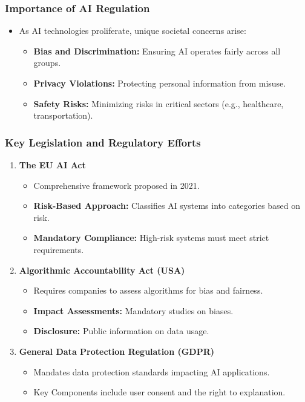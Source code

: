 \documentclass[aspectratio=169]{beamer}
\begin{document}
\begin{frame}[fragile]
    \frametitle{Importance of AI Regulation}
    \begin{itemize}
        \item As AI technologies proliferate, unique societal concerns arise:
        \begin{itemize}
            \item \textbf{Bias and Discrimination:} Ensuring AI operates fairly across all groups.
            \item \textbf{Privacy Violations:} Protecting personal information from misuse.
            \item \textbf{Safety Risks:} Minimizing risks in critical sectors (e.g., healthcare, transportation).
        \end{itemize}
    \end{itemize}
\end{frame}

\begin{frame}[fragile]
    \frametitle{Key Legislation and Regulatory Efforts}
    \begin{enumerate}
        \item \textbf{The EU AI Act}
        \begin{itemize}
            \item Comprehensive framework proposed in 2021.
            \item \textbf{Risk-Based Approach:} Classifies AI systems into categories based on risk.
            \item \textbf{Mandatory Compliance:} High-risk systems must meet strict requirements.
        \end{itemize}
        
        \item \textbf{Algorithmic Accountability Act (USA)}
        \begin{itemize}
            \item Requires companies to assess algorithms for bias and fairness.
            \item \textbf{Impact Assessments:} Mandatory studies on biases.
            \item \textbf{Disclosure:} Public information on data usage.
        \end{itemize}
        
        \item \textbf{General Data Protection Regulation (GDPR)}
        \begin{itemize}
            \item Mandates data protection standards impacting AI applications.
            \item Key Components include user consent and the right to explanation.
        \end{itemize}
    \end{enumerate}
\end{frame}
\end{document}
